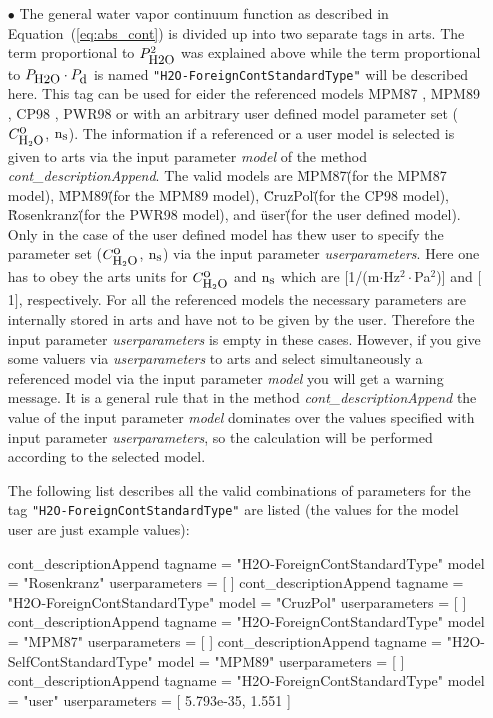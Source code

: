 \begin{itemize}
\item[$\bullet$] The general water vapor continuum function
as described in Equation~(\ref{eq:abs_cont}) is divided up into 
two separate tags in arts. The term proportional 
to $P_{\mbox{\rm \small H2O}}^2$ was explained above while the term proportional 
to $P_{\mbox{\rm \small H2O}} \cdot P_{\mbox{\rm \small d}}$ is named {\tt "H2O-ForeignContStandardType"}
will be described here.
This tag can be used for eider the referenced models 
MPM87 \citep{liebeandlayton:87}, MPM89 \citep{liebe:89}, 
CP98 \citep{cruzpol:98}, PWR98 \citep{pwr:98} or with
an arbitrary user defined model parameter set ($C^{\mbox{\rm o}}_{\mbox{\rm \small H}_{2}\mbox{\rm \small O}}$, ${\rm n}_{\mbox{\rm \small s}}$).
The information if a referenced or a user model is selected 
is given to arts via the input parameter {\it model} of the 
method {\it cont\_descriptionAppend}. The valid models are
\"MPM87\" (for the MPM87 model), \"MPM89\" (for the MPM89 model), 
\"CruzPol\" (for the CP98 model), \"Rosenkranz\" (for the PWR98 model), 
and \"user\"  (for the user defined model). Only in the case 
of the user defined model has thew user to specify the 
parameter set ($C^{\mbox{\rm o}}_{\mbox{\rm \small H}_{2}\mbox{\rm \small O}}$, ${\rm n}_{\mbox{\rm \small s}}$) via the input parameter 
{\it userparameters}. Here one has to obey the arts units for 
$C^{\mbox{\rm o}}_{\mbox{\rm \small H}_{2}\mbox{\rm \small O}}$ and ${\rm n}_{\mbox{\rm \small s}}$ which are $[$1/(m$\cdot$Hz$^2\cdot$Pa$^2$)$]$ and 
$[$1$]$, respectively. For all the referenced models the necessary
parameters are internally stored in arts and have not to be given by
the user. Therefore the input parameter {\it userparameters} is empty
in these cases. However, if you give some valuers via 
{\it userparameters} to arts and select simultaneously a 
referenced model via the input parameter {\it model} you will get 
a warning message. It is a general rule that in the method 
{\it cont\_descriptionAppend} the value of the input 
parameter {\it model} dominates over the values specified with 
input parameter {\it userparameters}, so the calculation will be
performed according to the selected model.

The following list describes all the valid combinations of parameters for the
tag {\tt "H2O-ForeignContStandardType"} are listed (the values for the 
model user are just example values): 
\begin{code}
cont_descriptionAppend{
    tagname        = "H2O-ForeignContStandardType"
    model          = "Rosenkranz"
    userparameters = [ ]
}
cont_descriptionAppend{
    tagname        = "H2O-ForeignContStandardType"
    model          = "CruzPol"
    userparameters = [ ]
}
cont_descriptionAppend{
    tagname        = "H2O-ForeignContStandardType"
    model          = "MPM87"
    userparameters = [ ]
}
cont_descriptionAppend{
    tagname        = "H2O-SelfContStandardType"
    model          = "MPM89"
    userparameters = [ ]
}
cont_descriptionAppend{
    tagname        = "H2O-ForeignContStandardType"
    model          = "user"
    userparameters = [ 5.793e-35, 1.551 ]
}
\end{code}



\end{itemize}
